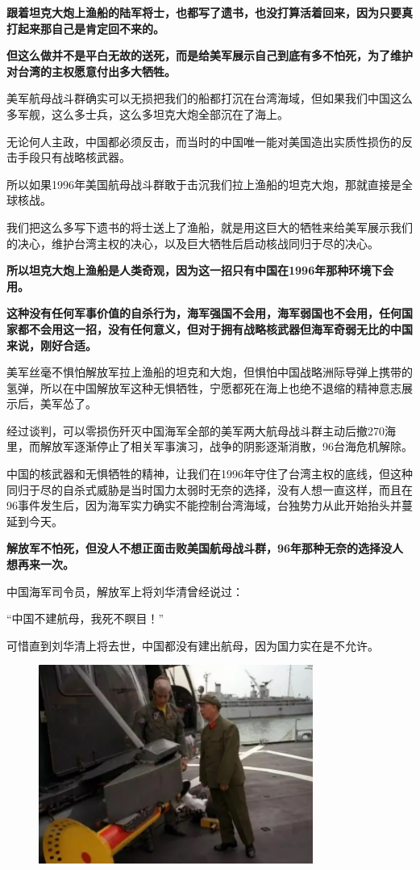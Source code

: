 \documentclass[UTF8, 11pt, oneside]{ctexart}
\newcommand{\zd}[1]{\textbf{\textcolor[RGB]{123,12,0}{#1}}} %
\newcommand{\yh}[1]{%
    \begin{tcolorbox}[enhanced,
        frame hidden, interior hidden,
        before skip = 5mm, left skip=10mm,
        borderline west={5pt}{0pt}{gray!50}]
        #1
    \end{tcolorbox}
}
\begin{document}
\zd{跟着坦克大炮上渔船的陆军将士，也都写了遗书，也没打算活着回来，因为只要真打起来那自己是肯定回不来的。}

\zd{但这么做并不是平白无故的送死，而是给美军展示自己到底有多不怕死，为了维护对台湾的主权愿意付出多大牺牲。}

美军航母战斗群确实可以无损把我们的船都打沉在台湾海域，但如果我们中国这么多军舰，这么多士兵，这么多坦克大炮全部沉在了海上。

无论何人主政，中国都必须反击，而当时的中国唯一能对美国造出实质性损伤的反击手段只有战略核武器。

所以如果1996年美国航母战斗群敢于击沉我们拉上渔船的坦克大炮，那就直接是全球核战。

我们把这么多写下遗书的将士送上了渔船，就是用这巨大的牺牲来给美军展示我们的决心，维护台湾主权的决心，以及巨大牺牲后启动核战同归于尽的决心。

\zd{所以坦克大炮上渔船是人类奇观，因为这一招只有中国在1996年那种环境下会用。}

\zd{这种没有任何军事价值的自杀行为，海军强国不会用，海军弱国也不会用，任何国家都不会用这一招，没有任何意义，但对于拥有战略核武器但海军奇弱无比的中国来说，刚好合适。}

美军丝毫不惧怕解放军拉上渔船的坦克和大炮，但惧怕中国战略洲际导弹上携带的氢弹，所以在中国解放军这种无惧牺牲，宁愿都死在海上也绝不退缩的精神意志展示后，美军怂了。

经过谈判，可以零损伤歼灭中国海军全部的美军两大航母战斗群主动后撤270海里，而解放军逐渐停止了相关军事演习，战争的阴影逐渐消散，96台海危机解除。

中国的核武器和无惧牺牲的精神，让我们在1996年守住了台湾主权的底线，但这种同归于尽的自杀式威胁是当时国力太弱时无奈的选择，没有人想一直这样，而且在96事件发生后，因为海军实力确实不能控制台湾海域，台独势力从此开始抬头并蔓延到今天。

\zd{解放军不怕死，但没人不想正面击败美国航母战斗群，96年那种无奈的选择没人想再来一次。}

中国海军司令员，解放军上将刘华清曾经说过：

\yh{“中国不建航母，我死不瞑目！” }

可惜直到刘华清上将去世，中国都没有建出航母，因为国力实在是不允许。

\begin{figure}[H]
    \centering
    \includegraphics[width=9cm]{2024-08-18-006.jpg}
\end{figure}
\end{document}
